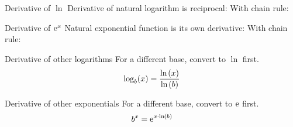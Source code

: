 \begin{multicols}{2}
 \begin{FormulaBox}{Derivative of $\ln$}
  Derivative of natural logarithm is reciprocal:
  \bigskip
  With chain rule:
 \end{FormulaBox}
 \begin{FormulaBox}{Derivative of $\mathrm{e}^x$}
  Natural exponential function is its own derivative:
  \WithSymbolDefs{
   \[ \D{\big.\me^{\X}} = \me^{\X} \]
  }
  \bigskip
  With chain rule:
 \end{FormulaBox}
 \begin{FormulaBox}{Derivative of other logarithms}
  For a different base, convert to $\ln$ first.
  \begin{equation*}
   \log_b (x) = \frac{\mathrm{ln}\hspace{-0.1ex}\left(x\right)}{\mathrm{ln}\hspace{-0.1ex}\left(b\right)}
  \end{equation*}
  \WithSymbolDefs{
   \[
    \D{\big.\log_b(\X)} = \frac{1}{\LN{b} \cdot \X}
   \]
  }
 \end{FormulaBox}
 \begin{FormulaBox}{Derivative of other exponentials}
  For a different base, convert to $\mathrm{e}$ first.
  \begin{equation*}
   b^x = \mathrm{e}^{x \cdot \mathrm{ln}\hspace{-0.1ex}\left(b\right)}
  \end{equation*}
  \WithSymbolDefs{
   \[
    \D{b^\X} = \LN{b} \cdot \me^{\X \cdot \LN{b}} = \LN{b} \cdot b^\X
   \]
  }
 \end{FormulaBox}
\end{multicols}

